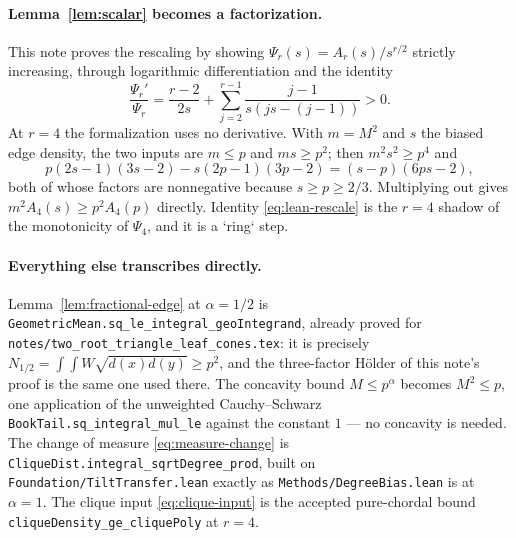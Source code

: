 \documentclass[11pt]{article}
\begin{document}
\paragraph{Lemma~\ref{lem:scalar} becomes a factorization.}
This note proves the rescaling by showing $\Psi_r(s)=A_r(s)/s^{r/2}$ strictly
increasing, through logarithmic differentiation and the identity
\[
 \frac{\Psi_r'}{\Psi_r}
 =\frac{r-2}{2s}+\sum_{j=2}^{r-1}\frac{j-1}{s(js-(j-1))}>0 .
\]
At $r=4$ the formalization uses no derivative.  With
$m=M^2$ and $s$ the biased edge density, the two inputs are $m\leq p$ and
$ms\geq p^2$; then $m^2s^2\geq p^4$ and
\begin{equation}
 p(2s-1)(3s-2)-s(2p-1)(3p-2)=(s-p)(6ps-2),
 \label{eq:lean-rescale}
\end{equation}
both of whose factors are nonnegative because $s\geq p\geq2/3$.  Multiplying
out gives $m^2A_4(s)\geq p^2A_4(p)$ directly.  Identity
\eqref{eq:lean-rescale} is the $r=4$ shadow of the monotonicity of $\Psi_4$,
and it is a `ring` step.

\paragraph{Everything else transcribes directly.}
Lemma~\ref{lem:fractional-edge} at $\alpha=1/2$ is
\texttt{GeometricMean.sq\_le\_integral\_geoIntegrand}, already proved for
\texttt{notes/two\_root\_triangle\_leaf\_cones.tex}: it is precisely
$N_{1/2}=\int\!\!\int W\sqrt{d(x)d(y)}\geq p^2$, and the three-factor H\"older
of this note's proof is the same one used there.  The concavity bound
$M\leq p^{\alpha}$ becomes $M^2\leq p$, one application of the unweighted
Cauchy--Schwarz \texttt{BookTail.sq\_integral\_mul\_le} against the constant
$1$ --- no concavity is needed.  The change of measure
\eqref{eq:measure-change} is \texttt{CliqueDist.integral\_sqrtDegree\_prod},
built on \texttt{Foundation/TiltTransfer.lean} exactly as
\texttt{Methods/DegreeBias.lean} is at $\alpha=1$.  The clique input
\eqref{eq:clique-input} is the accepted pure-chordal bound
\texttt{cliqueDensity\_ge\_cliquePoly} at $r=4$.
\end{document}
